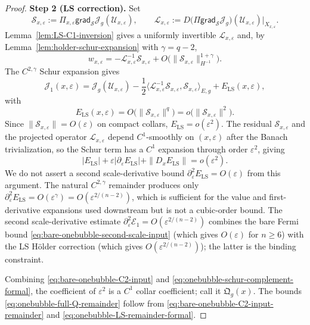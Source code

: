 \documentclass[11pt,reqno,a4paper]{amsart}
\numberwithin{equation}{section}
\theoremstyle{plain}
\theoremstyle{remark}
\theoremstyle{plain}
\begin{document}
\begin{proof}
\smallskip\noindent
\textbf{Step 2 (LS correction).}
Set
\[
\mathcal S_{x,\varepsilon}:=
\Pi_{x,\varepsilon}\mathsf{grad}_{\mathcal S}\mathcal J_g(\mathcal U_{x,\varepsilon}),
\qquad
\mathcal L_{x,\varepsilon}:=
D\bigl(\Pi\mathsf{grad}_{\mathcal S}\mathcal J_g\bigr)(\mathcal U_{x,\varepsilon})|_{X_{x,\varepsilon}} .
\]
Lemma~\ref{lem:LS-C1-inversion} gives a uniformly invertible $\mathcal L_{x,\varepsilon}$ and,
by Lemma~\ref{lem:holder-schur-expansion} with $\gamma=q-2$,
\[
 w_{x,\varepsilon}
 =-\mathcal L_{x,\varepsilon}^{-1}\mathcal S_{x,\varepsilon}
 +O\bigl(\|\mathcal S_{x,\varepsilon}\|_{H^{-1}}^{1+\gamma}\bigr).
\]
The $C^{2,\gamma}$ Schur expansion gives
\begin{equation}\label{eq:onebubble-schur-complement-formal}
\mathcal J_1(x,\varepsilon)
=
\mathcal J_g(\mathcal U_{x,\varepsilon})
-\frac12\big\langle
\mathcal L_{x,\varepsilon}^{-1}\mathcal S_{x,\varepsilon},
\mathcal S_{x,\varepsilon}
\big\rangle_{E,g}
+E_{\mathrm{LS}}(x,\varepsilon),
\end{equation}
with
\begin{equation}\label{eq:onebubble-LS-remainder-formal}
E_{\mathrm{LS}}(x,\varepsilon)
=
O\bigl(\|\mathcal S_{x,\varepsilon}\|^q\bigr)
=
o\bigl(\|\mathcal S_{x,\varepsilon}\|^2\bigr).
\end{equation}
Since $\|\mathcal S_{x,\varepsilon}\|=O(\varepsilon)$ on compact collars,
$E_{\mathrm{LS}}=o(\varepsilon^2)$.
The residual $\mathcal S_{x,\varepsilon}$ and the projected operator
$\mathcal L_{x,\varepsilon}$ depend $C^1$-smoothly on $(x,\varepsilon)$ after
the Banach trivialization, so the Schur term has a $C^1$ expansion through
order $\varepsilon^2$, giving
\[
|E_{\mathrm{LS}}|+
\varepsilon|\partial_\varepsilon E_{\mathrm{LS}}|+
\|D_xE_{\mathrm{LS}}\|=o(\varepsilon^2).
\]
We do not assert a second scale-derivative bound
$\partial_\varepsilon^2 E_{\mathrm{LS}}=O(\varepsilon)$ from this argument.
The natural $C^{2,\gamma}$ remainder produces only
$\partial_\varepsilon^2 E_{\mathrm{LS}}=O(\varepsilon^\gamma)=O(\varepsilon^{2/(n-2)})$,
which is sufficient for the value and first-derivative expansions used
downstream but is not a cubic-order bound.
The second scale-derivative estimate
$\partial_\varepsilon^2\mathcal E_1=O(\varepsilon^{2/(n-2)})$
combines the bare Fermi bound
\eqref{eq:bare-onebubble-second-scale-input} (which gives $O(\varepsilon)$ for
$n\ge6$) with the LS H\"older correction (which gives $O(\varepsilon^{2/(n-2)})$);
the latter is the binding constraint.

Combining \eqref{eq:bare-onebubble-C2-input} and \eqref{eq:onebubble-schur-complement-formal}, the coefficient
of $\varepsilon^2$ is a $C^1$ collar coefficient; call it $\mathfrak Q_g(x)$.  The bounds
\eqref{eq:onebubble-full-Q-remainder} follow from
\eqref{eq:bare-onebubble-C2-input-remainder} and
\eqref{eq:onebubble-LS-remainder-formal}.


\end{proof}
\end{document}
